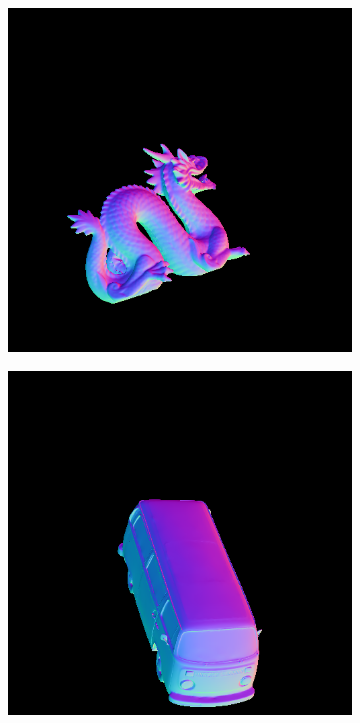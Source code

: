 \documentclass[border=15pt, multi, tikz]{article}
\begin{document}
\begin{figure}[H]
\begin{subfigure}[b]{0.18\linewidth}
	\end{subfigure}
	\begin{subfigure}[b]{0.18\linewidth}
		\includegraphics[width=\linewidth]{./Figures/test_scenes/05113.normal0.png}
	\end{subfigure}
	\begin{subfigure}[b]{0.18\linewidth}
		\includegraphics[width=\linewidth]{./Figures/test_scenes/05126.normal0.png}
	\end{subfigure}
	

\end{figure}
\end{document}
